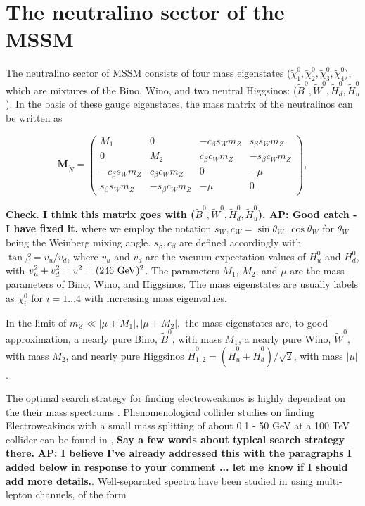 \documentclass[a4paper,11pt]{article}
\newcommand{\Shufang}[1]{{\bf\color{Maroon}  #1}}
\newcommand{\Adarsh}[1]{{\bf\color{RoyalBlue} AP: #1}}
\renewcommand{\H}{\widetilde{H}^0}
\newcommand{\B}{\widetilde{B}^0}
\newcommand{\N}{\widetilde{\chi}^0}
\begin{document}
\section{The neutralino sector of the MSSM}
\label{sec:model}

 
The neutralino sector of MSSM consists of four mass eigenstates
($\N_1,\N_2,\N_3,\N_4$), which
are mixtures of the Bino, Wino, and two neutral Higgsinos: 
($\B,\widetilde{W}^0,\H_d,\H_u$). In the basis of these gauge eigenstates, the mass
matrix of the neutralinos can be written as

\newcommand{\cb}{ c_\beta}
\newcommand{\cw}{ c_W}
\newcommand{\sinb}{ s_\beta}
\newcommand{\sw}{ s_W}
\newcommand{\mz}{ m_Z}

\[\mathbf{M}_{\widetilde{N}}=
\begin{pmatrix}
  M_1 & 0 & -\cb\sw\mz & \sinb\sw\mz \\
  0 & M_2 & \cb\cw\mz & -\sinb\cw\mz \\
  -\cb\sw\mz & \cb\cw\mz & 0 & -\mu \\
  \sinb\sw\mz & -\sinb\cw\mz & -\mu & 0
\end{pmatrix},\]

\Shufang{Check.  I think this matrix goes with
($\B,\widetilde{W}^0,\H_d,\H_u$). \Adarsh{Good catch - I have fixed it.}}
\noindent where we employ the notation $s_W, c_W = \sin\theta_W, \cos\theta_W$
for $\theta_W$ being the Weinberg mixing angle. $s_\beta, c_\beta$ are defined
accordingly with $\tan\beta= v_u/v_d$, where $v_u$ and $v_d$ are the vacuum
expectation values of $H_u^0$ and $H_d^0$, with $v_u^2+v_d^2=v^2=(246\ {\rm
GeV})^2$. The parameters $M_1$, $M_2$, and $\mu$ are the mass parameters of
Bino, Wino, and Higgsinos.  The mass eigenstates are usually labels as
$\chi_i^0$ for $i=1 \ldots 4$ with increasing mass eigenvalues.

In the limit of $\mz \ll |\mu\pm M_1|, |\mu\pm M_2|,$ the mass eigenstates
are, to good approximation, a nearly pure Bino, $\B$, with mass $M_1$,
a nearly pure Wino, $\widetilde{W}^0$, with mass $M_2$, and nearly pure Higgsinos
$\H_{1,2} = (\H_u \pm \H_d)/\sqrt{2}$, with mass
$|\mu|$. 

The optimal search strategy for finding electroweakinos is highly dependent on
the their mass spectrums \citep{Han:2013kza}.  Phenomenological collider studies on finding
Electroweakinos with a small mass splitting of about 0.1 - 50 GeV at a 100 TeV collider can be
found in \citep{Low:2014cba, Bramante:2014tba, Berlin:2015aba, Cirelli:2014dsa},
\Shufang{Say a few words about typical search strategy there.} \Adarsh{I
believe I've already addressed this with the paragraphs I added below in response
to your comment ... let me know if I should add more details.}.
Well-separated spectra have been studied in \citep{Gori:2014oua,
Acharya:2014pua} using
multi-lepton channels, of the form 
\end{document}
